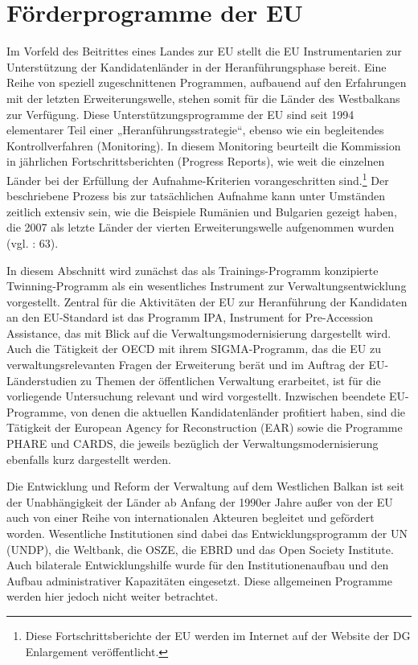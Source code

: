 \section{Förderprogramme der EU}
\label{sec:foerderprogramme}
Im Vorfeld des Beitrittes eines Landes zur EU stellt die EU Instrumentarien zur Unterstützung der Kandidatenländer in der Heranführungsphase bereit. Eine Reihe von speziell zugeschnittenen Programmen, aufbauend auf den Erfahrungen mit der letzten Erweiterungswelle, stehen somit für die Länder des Westbalkans zur Verfügung. Diese Unterstützungsprogramme der EU sind seit 1994 elementarer Teil einer „Heranführungsstrategie“, ebenso wie ein begleitendes Kontrollverfahren (Monitoring). In diesem Monitoring beurteilt die Kommission in jährlichen Fortschrittsberichten (Progress Reports), wie weit die einzelnen Länder bei der Erfüllung der Aufnahme-Kriterien vorangeschritten sind.\footnote{Diese Fortschrittsberichte der EU werden im Internet auf der Website der DG Enlargement veröffentlicht.} Der beschriebene Prozess bis zur tatsächlichen Aufnahme kann unter Umständen zeitlich extensiv sein, wie die Beispiele Rumänien und Bulgarien gezeigt haben, die 2007 als letzte Länder der vierten Erweiterungswelle aufgenommen wurden (vgl. \cite{scherman} : 63). 
\par
In diesem Abschnitt wird zunächst das als Trainings-Programm konzipierte Twinning-Programm als ein wesentliches Instrument zur Verwaltungsentwicklung vorgestellt. Zentral für die Aktivitäten der EU zur Heranführung der Kandidaten an den EU-Standard ist das Programm IPA, Instrument for Pre-Accession Assistance, das mit Blick auf die Verwaltungsmodernisierung dargestellt wird. Auch die Tätigkeit der OECD mit ihrem SIGMA-Programm, das die EU zu verwaltungsrelevanten Fragen der Erweiterung berät und im Auftrag der EU-Länderstudien zu Themen der öffentlichen Verwaltung erarbeitet, ist für die vorliegende Untersuchung relevant und wird vorgestellt. Inzwischen beendete EU-Programme, von denen die aktuellen Kandidatenländer profitiert haben, sind die Tätigkeit der European Agency for Reconstruction (EAR) sowie die Programme PHARE und CARDS, die jeweils bezüglich der Verwaltungsmodernisierung ebenfalls kurz dargestellt werden. \par
Die Entwicklung und Reform der Verwaltung auf dem Westlichen Balkan ist seit der Unabhängigkeit der Länder ab Anfang der 1990er Jahre außer von der EU auch von einer Reihe von internationalen Akteuren begleitet und gefördert worden. Wesentliche Institutionen sind dabei das Entwicklungsprogramm der UN (UNDP), die Weltbank, die OSZE, die EBRD und das Open Society Institute. Auch bilaterale Entwicklungshilfe wurde für den Institutionenaufbau und den Aufbau administrativer Kapazitäten eingesetzt. Diese allgemeinen Programme werden hier jedoch nicht weiter betrachtet.

